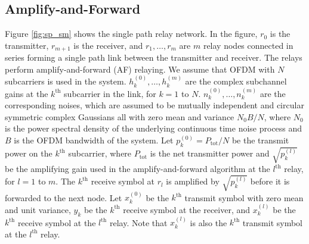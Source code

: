 \documentclass[journal]{IEEEtran}
\begin{document}
\subsection{Amplify-and-Forward}
\label{sec:sp_af}
Figure \ref{fig:sp_sm} shows the single path
relay network. In the figure, $r_0$ is the transmitter, $r_{m+1}$
is the receiver, and $r_1, \ldots, r_m$ are $m$ relay nodes
connected in series forming a single path link between the
transmitter and receiver.  The relays perform amplify-and-forward
(AF) relaying. We assume that OFDM with $N$ subcarriers is used in
the system.  $h_k^{(0)}, \ldots, h_k^{(m)}$ are the complex subchannel gains at the $k^{\mbox{th}}$ subcarrier in the link, for $k = 1$ to $N$.   $n_k^{(0)}, \ldots, n_k^{(m)}$ are the corresponding noises, which are assumed to be mutually independent and circular symmetric complex Gaussians all with zero mean and variance $N_0 B / N$, where $N_0$ is the power spectral density of the underlying continuous time noise process and $B$ is the OFDM bandwidth of the system.  Let $p_k^{(0)} = P_{\mbox{tot}} / N$ be the transmit power on the $k^{\mbox{th}}$ subcarrier, where $P_{\mbox{tot}}$ is the net transmitter power and $\sqrt{p_k^{(l)}}$ be the amplifying gain used in the amplify-and-forward algorithm at the $l^{\mbox{th}}$ relay, for $l=1$ to $m$.  The $k^{\mbox{th}}$ receive symbol at $r_l$ is amplified by $\sqrt{p_k^{(l)}}$ before it is forwarded to the next node.  Let $x_k^{(0)}$ be the $k^{\mbox{th}}$ transmit symbol with zero mean and unit variance, $y_k$ be the $k^{\mbox{th}}$ receive symbol at the receiver, and $x_k^{(l)}$ be the $k^{\mbox{th}}$ receive symbol at the $l^{\mbox{th}}$ relay.  Note that $x_k^{(l)}$ is also the $k^{\mbox{th}}$ transmit symbol at the $l^{\mbox{th}}$ relay.
\end{document}
